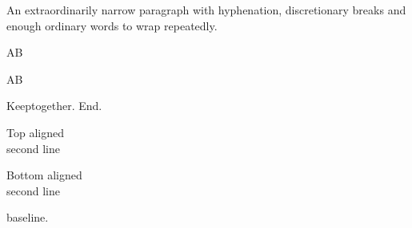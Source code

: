 \documentclass{article}
\begin{document}
\begin{minipage}{150pt}
An extraordinarily narrow paragraph with hyphenation, dis\-cretion\-ary breaks and enough ordinary words to wrap repeatedly.
\par\noindent A\hfill B\par A\hspace{12pt}B\par
Keep\nobreak\hspace{1em}together. End.\par
\end{minipage}
\par\medskip
\parbox[t]{120pt}{Top aligned\\second line}\quad\parbox[b]{120pt}{Bottom aligned\\second line}
\par\noindent{}\quad{} baseline.
\end{document}
